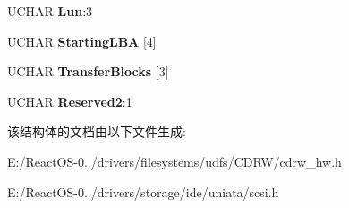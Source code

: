 \begin{DoxyCompactItemize}
\item 
\mbox{\label{struct___c_d_b_1_1___r_e_a_d___c_d_a543a3f637d2fbd37dd80234e30b8739d}} 
U\+C\+H\+AR {\bfseries Lun}\+:3
\item 
\mbox{\label{struct___c_d_b_1_1___r_e_a_d___c_d_a1910036fc99eda227ebf9e7a1d282e92}} 
U\+C\+H\+AR {\bfseries Starting\+L\+BA} \mbox{[}4\mbox{]}
\item 
\mbox{\label{struct___c_d_b_1_1___r_e_a_d___c_d_aa1631a2837e414ba77db1a9b7e7b62a5}} 
U\+C\+H\+AR {\bfseries Transfer\+Blocks} \mbox{[}3\mbox{]}
\item 
\mbox{\label{struct___c_d_b_1_1___r_e_a_d___c_d_ad7ca7efd3e03cc0221d9bcd2225472c3}} 
U\+C\+H\+AR {\bfseries Reserved2}\+:1
\end{DoxyCompactItemize}


该结构体的文档由以下文件生成\+:\begin{DoxyCompactItemize}
\item 
E\+:/\+React\+O\+S-\/0../drivers/filesystems/udfs/\+C\+D\+R\+W/cdrw\+\_\+hw.\+h\item 
E\+:/\+React\+O\+S-\/0../drivers/storage/ide/uniata/scsi.\+h\end{DoxyCompactItemize}
